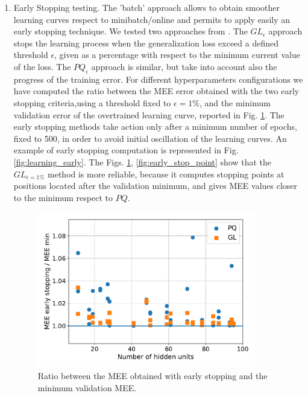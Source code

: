 \documentclass[11pt,twoside]{article}
\begin{document}
\begin{enumerate}
\item Early Stopping testing.
  The 'batch' approach allows to obtain smoother learning curves respect to minibatch/online and permits to apply easily an early stopping technique. We tested two approaches from \cite{early_stopping}.
  The $GL_{\epsilon}$ approach stops the learning process when the generalization loss exceed a defined threshold $\epsilon$, given as a percentage with respect to the minimum current value of the loss. The $PQ_{\epsilon}$ approach is similar, but take into account also the progress of the training error.
  For different hyperparameters configurations we have computed the ratio between the MEE error obtained with the two early stopping criteria,using a threshold fixed to $\epsilon=1\%$, and the minimum validation error of the overtrained learning curve, reported in Fig. \ref{fig:early_stop}. The early stopping methods take action only after a minimum number of epochs, fixed to 500, in order to avoid initial oscillation of the learning curves. An example of early stopping computation is represented in Fig. \ref{fig:learning_early}. The Figs. \ref{fig:early_stop}, \ref{fig:early_stop_point} show that the $GL_{\epsilon=1\%}$ method is more reliable, because it computes stopping points at positions located after the validation minimum, and gives MEE values closer to the minimum respect to $PQ$.

  \begin{figure}[htbp]
    \centering
    \includegraphics[width=0.90\textwidth]{img/early_stop.pdf}
    \caption{Ratio between the MEE obtained with early stopping and the minimum validation MEE.}
    \label{fig:early_stop}
  \end{figure}


\end{enumerate}
\end{document}

